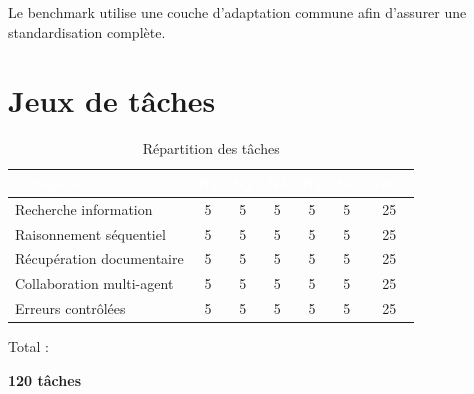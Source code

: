 \documentclass[12pt,a4paper]{article}
\begin{document}
Le benchmark utilise
une couche d'adaptation commune
afin d'assurer
une standardisation complète.


\section{Jeux de tâches}


\begin{table}[H]

\centering

\small

\begin{tabular}{lcccccc}

\toprule

\rowcolor{primary}
\textcolor{white}{\textbf{Catégorie}} &
\textcolor{white}{\textbf{N1}} &
\textcolor{white}{\textbf{N2}} &
\textcolor{white}{\textbf{N3}} &
\textcolor{white}{\textbf{N4}} &
\textcolor{white}{\textbf{N5}} &
\textcolor{white}{\textbf{Total}} \\

\midrule

Recherche information & 5 & 5 & 5 & 5 & 5 & 25 \\

Raisonnement séquentiel & 5 & 5 & 5 & 5 & 5 & 25 \\

Récupération documentaire & 5 & 5 & 5 & 5 & 5 & 25 \\

Collaboration multi-agent & 5 & 5 & 5 & 5 & 5 & 25 \\

Erreurs contrôlées & 5 & 5 & 5 & 5 & 5 & 25 \\

\bottomrule

\end{tabular}

\caption{Répartition des tâches}

\end{table}

Total :

\begin{center}

\Huge\bfseries\color{primary}
120 tâches

\end{center}
\end{document}
